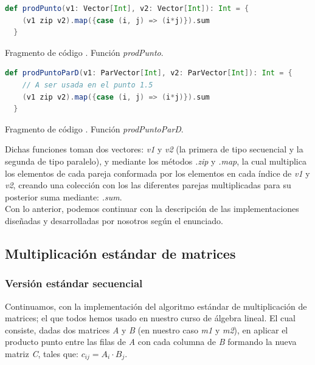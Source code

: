 \documentclass{article}
\newcounter{codesnippet}
\newcommand{\newcodesnippet}{%
  \stepcounter{codesnippet}%
}
\begin{document}
\newcodesnippet
\begin{lstlisting}[language=Scala]
  def prodPunto(v1: Vector[Int], v2: Vector[Int]): Int = {
    (v1 zip v2).map({case (i, j) => (i*j)}).sum
  }
\end{lstlisting}
\begin{center}
    \small{Fragmento de código \thecodesnippet. Función \textit{prodPunto}.}
\end{center}

\newcodesnippet
\begin{lstlisting}[language=Scala]
  def prodPuntoParD(v1: ParVector[Int], v2: ParVector[Int]): Int = {
    // A ser usada en el punto 1.5
    (v1 zip v2).map({case (i, j) => (i*j)}).sum
  }
\end{lstlisting}
\begin{center}
    \small{Fragmento de código \thecodesnippet. Función \textit{prodPuntoParD}.}
\end{center}

Dichas funciones toman dos vectores: \textit{v1} y \textit{v2} (la primera de tipo secuencial y la segunda de tipo paralelo), y mediante los métodos \textit{.zip} y \textit{.map}, la cual multiplica los elementos de cada pareja conformada por los elementos en cada índice de \textit{v1} y \textit{v2}, creando una colección con los las diferentes parejas multiplicadas para su posterior suma mediante: \textit{.sum}. \\

Con lo anterior, podemos continuar con la descripción de las implementaciones diseñadas y desarrolladas por nosotros según el enunciado.

\subsection{Multiplicación estándar de matrices}
\subsubsection{Versión estándar secuencial}

Continuamos, con la implementación del algoritmo estándar de multiplicación de matrices; el que todos hemos usado en nuestro curso de álgebra lineal. El cual consiste, dadas dos matrices \textit{A} y \textit{B} (en nuestro caso \textit{m1} y \textit{m2}), en aplicar el producto punto entre las filas de \textit{A} con cada columna de \textit{B} formando la nueva matriz \textit{C}, tales que: \(c_{ij} = A_i \cdot B_j \). \\ 
\end{document}
